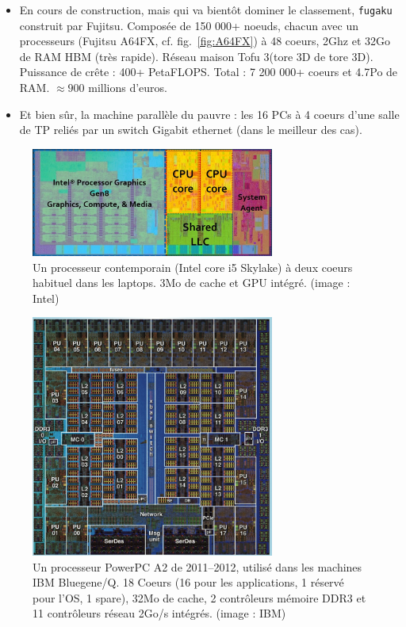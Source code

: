 \begin{itemize}
\medskip
  
\item En cours de construction, mais qui va bientôt dominer le classement,
  \texttt{fugaku} construit par Fujitsu. Composée de 150 000+ noeuds, chacun
  avec un processeurs (Fujitsu A64FX, cf. fig.~\ref{fig:A64FX}) à 48 coeurs,
  2Ghz et 32Go de RAM HBM (très rapide). Réseau maison \og Tofu 3\fg (tore 3D de
  tore 3D). Puissance de crête : 400+ PetaFLOPS. Total : 7 200 000+ coeurs et
  4.7Po de RAM. $\approx 900$ millions d'euros.

\medskip
  
\item Et bien sûr, la machine parallèle du pauvre : les 16 PCs à 4 coeurs d'une
  salle de TP reliés par un switch Gigabit ethernet (dans le meilleur des cas).
\end{itemize}

\begin{figure}
  \centering
  \includegraphics[width=8cm]{i5-silicon-die-layout.jpg}
  \caption{Un processeur contemporain (Intel core i5 \og Skylake\fg) à deux
    coeurs habituel dans les laptops. 3Mo de cache et GPU intégré. (image : Intel)}
\end{figure}

\begin{figure}
  \centering
  \includegraphics[width=8cm]{die-bgq.png}
  \caption{Un processeur PowerPC A2 de 2011--2012, utilisé dans les machines IBM
    Bluegene/Q. 18 Coeurs (16 pour les applications, 1 réservé pour l'OS, 1
    spare), 32Mo de cache, 2 contrôleurs mémoire DDR3 et 11 contrôleurs réseau
    2Go/s intégrés. (image : IBM) \label{fig:powerpcA2}}
\end{figure}


